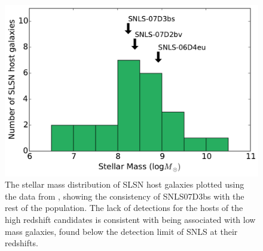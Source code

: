 \begin{figure}
\includegraphics[width=\textwidth]{Figures/Chapter3/Galaxy}
\caption{The stellar mass distribution of SLSN host galaxies plotted using the data from \citet{Lunnan2014}, showing the consistency of SNLS07D3bs with the rest of the population. The lack of detections for the hosts of the high redshift candidates is consistent with being associated with low mass galaxies, found below the detection limit of SNLS at their redshifts.}
\label{fig:hosts}
\end{figure}
